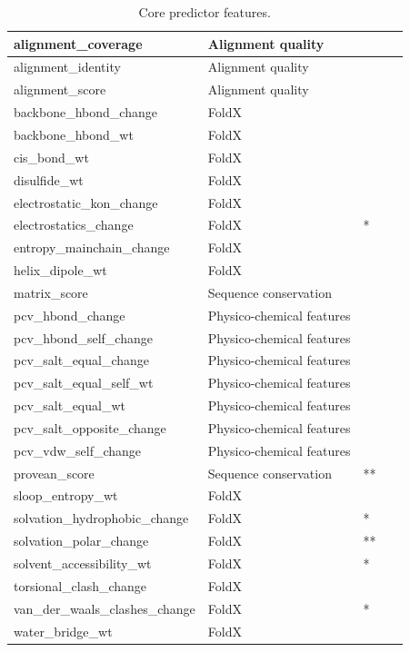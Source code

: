 \begin{table}[ht]
	\caption{Core predictor features.} \label{tab:core_features}
	\begin{tabular}{ | l | l | l | l | }
	\hline
		alignment\_coverage & Alignment quality & \  & \  \\ \hline
		alignment\_identity & Alignment quality & \  & \  \\ \hline
		alignment\_score & Alignment quality & \  & \  \\ \hline
		backbone\_hbond\_change & FoldX & \  & \  \\ \hline
		backbone\_hbond\_wt & FoldX & \  & \  \\ \hline
		cis\_bond\_wt & FoldX & \  & \  \\ \hline
		disulfide\_wt & FoldX & \  & \  \\ \hline
		electrostatic\_kon\_change & FoldX & \  & \  \\ \hline
		electrostatics\_change & FoldX & * & \  \\ \hline
		entropy\_mainchain\_change & FoldX & \  & \  \\ \hline
		helix\_dipole\_wt & FoldX & \  & \  \\ \hline
		matrix\_score & Sequence conservation & \  & \  \\ \hline
		pcv\_hbond\_change & Physico-chemical features & \  & \  \\ \hline
		pcv\_hbond\_self\_change & Physico-chemical features & \  & \  \\ \hline
		pcv\_salt\_equal\_change & Physico-chemical features & \  & \  \\ \hline
		pcv\_salt\_equal\_self\_wt & Physico-chemical features & \  & \  \\ \hline
		pcv\_salt\_equal\_wt & Physico-chemical features & \  & \  \\ \hline
		pcv\_salt\_opposite\_change & Physico-chemical features & \  & \  \\ \hline
		pcv\_vdw\_self\_change & Physico-chemical features & \  & \  \\ \hline
		provean\_score & Sequence conservation & ** &  \\ \hline
		sloop\_entropy\_wt & FoldX & \  & \  \\ \hline
		solvation\_hydrophobic\_change & FoldX & * & \  \\ \hline
		solvation\_polar\_change & FoldX & ** &  \\ \hline
		solvent\_accessibility\_wt & FoldX & * & \  \\ \hline
		torsional\_clash\_change & FoldX & \  & \  \\ \hline
		van\_der\_waals\_clashes\_change & FoldX & * & \  \\ \hline
		water\_bridge\_wt & FoldX & \  & \  \\ \hline
	\end{tabular}
\end{table}


